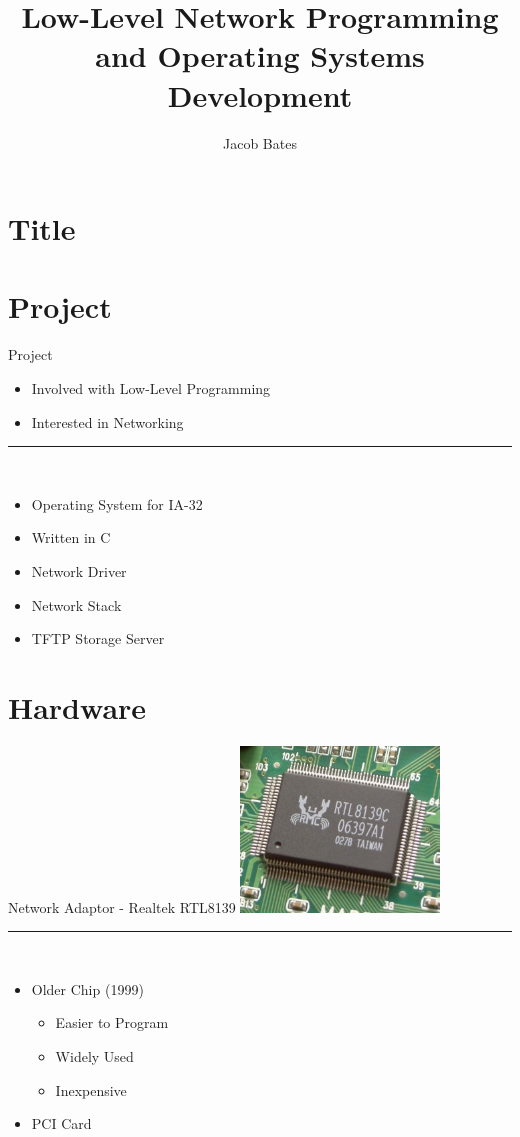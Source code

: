 \documentclass{beamer}
\title{Low-Level Network Programming and Operating Systems Development}
\author{Jacob Bates}
\institute{Da Vinci Science High School}
\begin{document}
\section{Title}

    \begin{frame}
        \titlepage
    \end{frame}

\section{Project}

    \begin{frame}{Project}
        \begin{itemize}
            \item Involved with Low-Level Programming
            \item Interested in Networking
        \end{itemize}
        \rule{0.5\textwidth}{0.5pt}\\
        \begin{itemize}
            \item Operating System for IA-32
            \item Written in C
            \item Network Driver
            \item Network Stack
            \item TFTP Storage Server
        \end{itemize}
    \end{frame}

\section{Hardware}

    \begin{frame}{Network Adaptor - Realtek RTL8139}
        \includegraphics[height=125pt]{Realtek_RTL8139C.jpg} \\
        \rule{0.5\textwidth}{0.5pt} \\
        \begin{itemize}
            \item Older Chip (1999)
            \begin{itemize}
                \item Easier to Program
                \item Widely Used
                \item Inexpensive
            \end{itemize}
            \item PCI Card
        \end{itemize}
    \end{frame}
\end{document}
